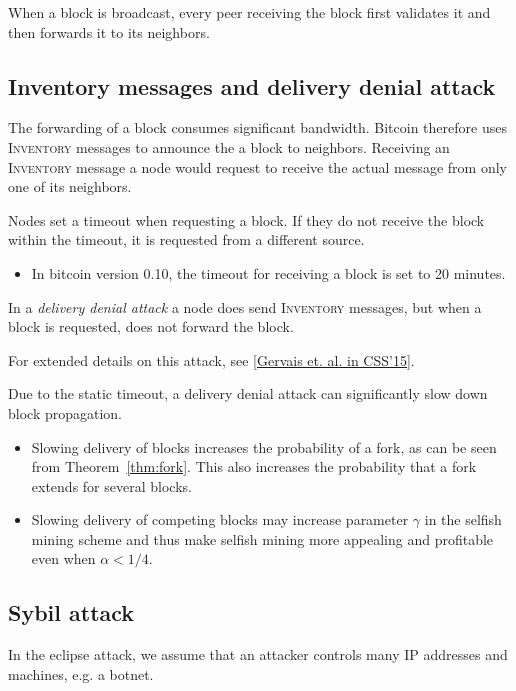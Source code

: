 When a block is broadcast, every peer receiving the block first validates it and then forwards it to its neighbors. 

\subsection{Inventory messages and delivery denial attack}
The forwarding of a block consumes significant bandwidth. 
Bitcoin therefore uses \textsc{Inventory} messages to announce the a block to neighbors. Receiving an \textsc{Inventory} message a node would request to receive the actual message from only one of its neighbors. 

Nodes set a timeout when requesting a block. If they do not receive the block within the timeout, it is requested from a different source.

\begin{itemize}
	\item In bitcoin version 0.10, the timeout for receiving a block is set to 20 minutes.
\end{itemize}

\begin{definition}
In a \emph{delivery denial attack} a node does send \textsc{Inventory} messages, but when a block is requested, does not forward the block.	
\end{definition}

For extended details on this attack, see \href{https://scalingbitcoin.org/zh_HANS/papers/bitcoin-block-transaction-delivery.pdf}{[Gervais et. al. in CSS'15]}.

\begin{note}
	Due to the static timeout, a delivery denial attack can significantly slow down block propagation.
	
	\begin{itemize}
		\item Slowing delivery of blocks increases the probability of a fork, as can be seen from Theorem~\ref{thm:fork}. This also increases the probability that a fork extends for several blocks.
		\item Slowing delivery of competing blocks may increase parameter $\gamma$ in the selfish mining scheme and thus make selfish mining more appealing and profitable even when $\alpha<1/4$.
	\end{itemize}
	
\end{note}

\subsection{Sybil attack}
In the eclipse attack, we assume that an attacker controls many IP addresses and machines, e.g. a botnet. 

